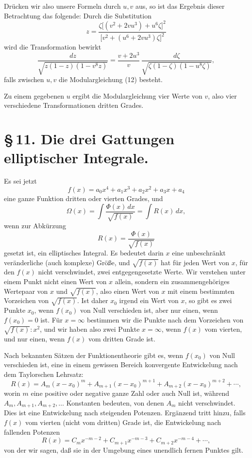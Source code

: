 \documentclass[11pt]{article}
\begin{document}
Drücken wir also unsere Formeln durch $u,v$ aus, so ist das Ergebnis dieser Betrachtung das folgende: Durch die Substitution
\[
z=\frac{\zeta\bigl[(v^2+2vu^3)+u^6\zeta\bigr]^2}
{\bigl[v^2+(u^6+2vu^3)\zeta\bigr]^2}
\]
wird die Transformation bewirkt
\[
\frac{dz}{\sqrt{z(1-z)(1-v^8z)}}
=
\frac{v+2u^3}{v}\,
\frac{d\zeta}{\sqrt{\zeta(1-\zeta)(1-u^8\zeta)}},
\]
falls zwischen $u,v$ die Modulargleichung (12) besteht.

Zu einem gegebenen $u$ ergibt die Modulargleichung vier Werte von $v$, also vier verschiedene Transformationen dritten Grades.

\section*{\S\,11. Die drei Gattungen elliptischer Integrale.}

Es sei jetzt
\begin{equation}
f(x)=a_0x^4+a_1x^3+a_2x^2+a_3x+a_4
\tag{1}
\end{equation}
eine ganze Funktion dritten oder vierten Grades, und
\begin{equation}
\Omega(x)=\int\frac{\Phi(x)\,dx}{\sqrt{f(x)}}=\int R(x)\,dx,
\tag{2}
\end{equation}
wenn zur Abkürzung
\begin{equation}
R(x)=\frac{\Phi(x)}{\sqrt{f(x)}}
\tag{3}
\end{equation}
gesetzt ist, ein elliptisches Integral. Es bedeutet darin $x$ eine unbeschränkt veränderliche (auch komplexe) Größe, und $\sqrt{f(x)}$ hat für jeden Wert von $x$, für den $f(x)$ nicht verschwindet, zwei entgegengesetzte Werte. Wir verstehen unter einem Punkt nicht einen Wert von $x$ allein, sondern ein zusammengehöriges Wertepaar von $x$ und $\sqrt{f(x)}$, also einen Wert von $x$ mit einem bestimmten Vorzeichen von $\sqrt{f(x)}$. Ist daher $x_0$ irgend ein Wert von $x$, so gibt es zwei Punkte $x_0$, wenn $f(x_0)$ von Null verschieden ist, aber nur einen, wenn $f(x_0)=0$ ist. Für $x=\infty$ bestimmen wir die Punkte nach dem Vorzeichen von $\sqrt{f(x)}:x^2$, und wir haben also zwei Punkte $x=\infty$, wenn $f(x)$ vom vierten, und nur einen, wenn $f(x)$ vom dritten Grade ist.

Nach bekannten Sätzen der Funktionentheorie gibt es, wenn $f(x_0)$ von Null verschieden ist, eine in einem gewissen Bereich konvergente Entwickelung nach dem Taylorschen Lehrsatz:
\begin{equation}
R(x)=A_m(x-x_0)^m+A_{m+1}(x-x_0)^{m+1}+A_{m+2}(x-x_0)^{m+2}+\cdots,
\tag{4}
\end{equation}
worin $m$ eine positive oder negative ganze Zahl oder auch Null ist, während $A_m,A_{m+1},A_{m+2},\ldots$ Konstanten bedeuten, von denen $A_m$ nicht verschwindet. Dies ist eine Entwickelung nach steigenden Potenzen. Ergänzend tritt hinzu, falls $f(x)$ vom vierten (nicht vom dritten) Grade ist, die Entwickelung nach fallenden Potenzen
\begin{equation}
R(x)=C_mx^{-m-2}+C_{m+1}x^{-m-3}+C_{m+2}x^{-m-4}+\cdots,
\tag{5}
\end{equation}
von der wir sagen, daß sie in der Umgebung eines unendlich fernen Punktes gilt.
\end{document}
